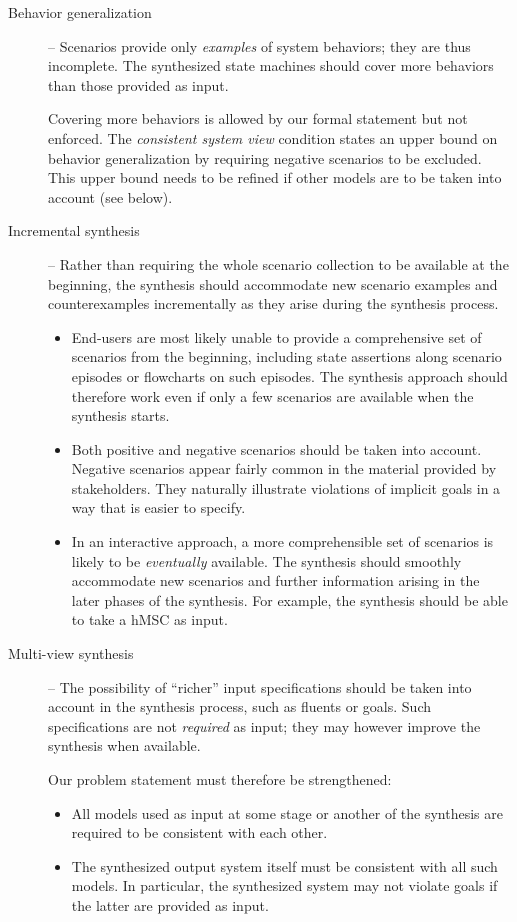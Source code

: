 \begin{description}
\item[Behavior generalization] -- Scenarios provide only \emph{examples} of system behaviors; they are thus incomplete. The synthesized state machines should cover more behaviors than those provided as input. 

Covering more behaviors is allowed by our formal statement but not enforced. The \emph{consistent system view} condition states an upper bound on behavior generalization by requiring negative scenarios to be excluded. This upper bound needs to be refined if other models are to be taken into account (see below).

\item[Incremental synthesis] -- Rather than requiring the whole scenario collection to be available at the beginning, the synthesis should accommodate new scenario examples and counterexamples incrementally as they arise during the synthesis process.
\begin{itemize}

\item End-users are most likely unable to provide a comprehensive set of scenarios from the beginning, including state assertions along scenario episodes or flowcharts on such episodes. The synthesis approach should therefore work even if only a few scenarios are available when the synthesis starts.

\item Both positive and negative scenarios should be taken into account. Negative scenarios appear fairly common in the material provided by stakeholders. They naturally illustrate violations of implicit goals in a way that is easier to specify.

\item In an interactive approach, a more comprehensible set of scenarios is likely to be \emph{eventually} available. The synthesis should smoothly accommodate new scenarios and further information arising in the later phases of the synthesis. For example, the synthesis should be able to take a hMSC as input. 

\end{itemize}

\item[Multi-view synthesis] -- The possibility of ``richer'' input specifications should be taken into account in the synthesis process, such as fluents or goals. Such specifications are not \emph{required} as input; they may however improve the synthesis when available. 

\noindent Our problem statement must therefore be strengthened: 
\begin{itemize}
\item All models used as input at some stage or another of the synthesis are required to be consistent with each other. 
\item The synthesized output system itself must be consistent with all such models. In particular, the synthesized system may not violate goals if the latter are provided as input.
\end{itemize}

\end{description}

